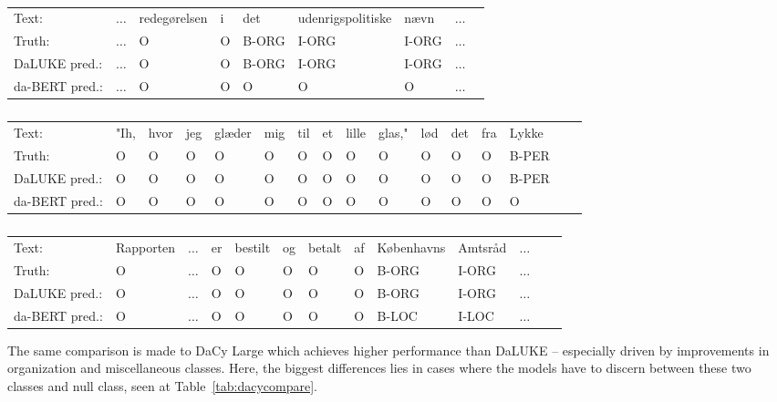 \documentclass[main.tex]{subfiles}
\begin{document}
\begin{table}[H]
    \footnotesize
    \begin{tabular}{l|llllllll}
        Text:             & $\ldots$  & redegørelsen  & i  & det    & udenrigspolitiske  & nævn   & $\ldots$ \\
        Truth:            & $\ldots$  & O             & O  & B-ORG  & I-ORG              & I-ORG  & $\ldots$ \\\hline
        DaLUKE pred.:     & $\ldots$  & O             & O  & B-ORG  & I-ORG              & I-ORG  & $\ldots$ \\
        da-BERT pred.:    & $\ldots$  & O             & O  & O      & O                  & O      & $\ldots$ \\
    \end{tabular}\par
    \begin{tabular}{l|lllllllllllllll}
        Text:            &  "Ih,   & hvor  & jeg  & glæder  & mig  & til  & et  & lille  & glas,"  & lød  & det  & fra  & Lykke  \\
        Truth:           &  O    & O     & O    & O       & O    & O    & O   & O      & O        & O    & O    & O    & B-PER  \\\hline
        DaLUKE pred.:    &  O    & O     & O    & O       & O    & O    & O   & O      & O        & O    & O    & O    & B-PER  \\
        da-BERT pred.:   &  O    & O     & O    & O       & O    & O    & O   & O      & O        & O    & O    & O    & O
    \end{tabular}\par
    \begin{tabular}{l|llllllllllll}
        Text:            & Rapporten  & $\ldots$  & er  & bestilt  & og  & betalt  & af  & Københavns  & Amtsråd  & $\ldots$\\
        Truth:           & O          & $\ldots$  & O   & O        & O   & O       & O   & B-ORG       & I-ORG    & $\ldots$\\\hline
        DaLUKE  pred.:   & O          & $\ldots$  & O   & O        & O   & O       & O   & B-ORG       & I-ORG    & $\ldots$\\
        da-BERT pred.:   & O          & $\ldots$  & O   & O        & O   & O       & O   & B-LOC       & I-LOC    & $\ldots$
    \end{tabular}
    \caption{
    }
    \label{tab:daberterrors}
\end{table}\noindent
The same comparison is made to DaCy Large which achieves higher performance than DaLUKE -- especially driven by improvements in organization and miscellaneous classes.
Here, the biggest differences lies in cases where the models have to discern between these two classes and  null class, seen at Table~\ref{tab:dacycompare}.
\end{document}
